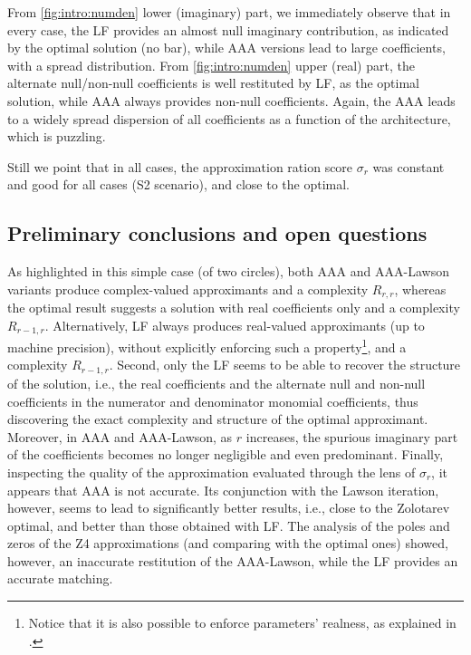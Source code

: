 From \cref{fig:intro:numden} lower (imaginary) part, we immediately observe that in every case, the LF provides an almost null imaginary contribution, as indicated by the optimal solution (no bar), while AAA versions lead to large coefficients, with a spread distribution. From \cref{fig:intro:numden} upper (real) part, the alternate null/non-null coefficients is well restituted by LF, as the optimal solution, while AAA always provides non-null coefficients. Again, the AAA leads to a widely spread dispersion of all coefficients as a function of the architecture, which is puzzling.  

Still we point that in all cases, the approximation ration score $\sigma_r$ was constant and  good for all cases (S2 scenario), and close to the optimal.

\subsection{Preliminary conclusions and open questions} 

As highlighted in this simple case (of two circles), both AAA and AAA-Lawson variants produce {complex-valued approximants} and a complexity $R_{r,r}$, whereas the optimal result suggests a solution with real coefficients only and a complexity $R_{r-1,r}$. Alternatively, LF always produces  real-valued approximants (up to machine precision), without explicitly enforcing such a property\footnote{Notice that it is also possible to enforce parameters' realness, as explained in \cite[\S 2.4.5]{ali17}.}, and a complexity $R_{r-1,r}$. Second, only the LF seems to be able to recover the structure of the solution, i.e., the real coefficients and the alternate null and non-null coefficients in the numerator and denominator monomial coefficients, thus discovering the exact complexity and structure of the optimal approximant. Moreover, in AAA and AAA-Lawson, as $r$ increases, the spurious imaginary part of the coefficients becomes no longer negligible and even predominant. Finally, inspecting the quality of the approximation evaluated through the lens of $\sigma_r$, it appears that AAA is not accurate. Its conjunction with the Lawson iteration, however, seems to lead to significantly better results, i.e., close to the Zolotarev optimal, and better than those obtained with LF. The analysis of the poles and zeros of the Z4 approximations (and comparing with the optimal ones) showed, however, an inaccurate restitution of the AAA-Lawson, while the LF provides an accurate matching.


